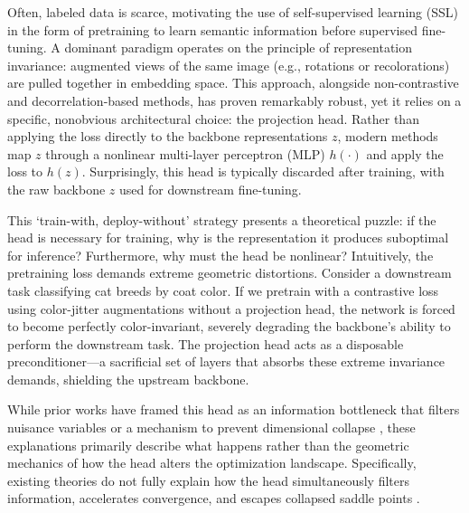 \documentclass{article}
\theoremstyle{plain}
\theoremstyle{definition}
\theoremstyle{remark}
\begin{document}
Often, labeled data is scarce, motivating the use of self-supervised learning (SSL) in the form of pretraining to learn semantic information before supervised fine-tuning. A dominant paradigm operates on the principle of representation invariance: augmented views of the same image (e.g., rotations or recolorations) are pulled together in embedding space. This approach, alongside non-contrastive and decorrelation-based methods, has proven remarkably robust, yet it relies on a specific, nonobvious architectural choice: the projection head. Rather than applying the loss directly to the backbone representations $z$, modern methods map $z$ through a nonlinear multi-layer perceptron (MLP) $h(\cdot)$ and apply the loss to $h(z)$. Surprisingly, this head is typically discarded after training, with the raw backbone $z$ used for downstream fine-tuning.

This `train-with, deploy-without' strategy presents a theoretical puzzle: if the head is necessary for training, why is the representation it produces suboptimal for inference? Furthermore, why must the head be nonlinear? Intuitively, the pretraining loss demands extreme geometric distortions. Consider a downstream task classifying cat breeds by coat color. If we pretrain with a contrastive loss using color-jitter augmentations without a projection head, the network is forced to become perfectly color-invariant, severely degrading the backbone's ability to perform the downstream task. The projection head acts as a disposable preconditioner---a sacrificial set of layers that absorbs these extreme invariance demands, shielding the upstream backbone.

While prior works have framed this head as an information bottleneck that filters nuisance variables \citep{tishby2015informationbottleneck, tan2024informationflow, ouyang2025projection} or a mechanism to prevent dimensional collapse \citep{jing2022understanding, tian2021understanding}, these explanations primarily describe what happens rather than the geometric mechanics of how the head alters the optimization landscape. Specifically, existing theories do not fully explain how the head simultaneously filters information, accelerates convergence, and escapes collapsed saddle points \citep{dauphin2014identifyingattackingsaddlepoint, ge2015escapingsaddlepoints}.
\end{document}
